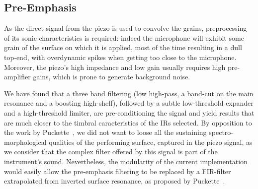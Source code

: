\subsection{Pre-Emphasis}\label{sec:preemph}

As the direct signal from the piezo is used to convolve the grains, preprocessing of its sonic characteristics is required: indeed the microphone will exhibit some grain of the surface on which it is applied, most of the time resulting in a dull top-end, with overdynamic spikes when getting too close to the microphone. Moreover, the piezo's high impedance and low gain usually requires high pre-amplifier gains, which is prone to generate background noise. 

We have found that a three band filtering (low high-pass, a band-cut on the main resonance and a boosting high-shelf), followed by a subtle low-threshold expander and a high-threshold limiter, are pre-conditioning the signal and yield results that are much closer to the timbral caracteristics of the IRs selected. By opposition to the work by Puckette~\cite{Puckette-icmc2011-infuriating-nonlinear-reverberator}, we did not want to loose all the sustaining spectro-morphological qualities of the performing surface, captured in the piezo signal, as we consider that the complex filter offered by this signal is part of the instrument's sound. Nevertheless, the modularity of the current implementation would easily allow the pre-emphasis filtering to be replaced by a FIR-filter extrapolated from inverted surface resonance, as proposed by Puckette~\cite{Puckette-icmc2011-infuriating-nonlinear-reverberator}.

